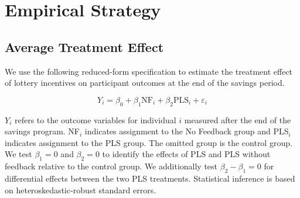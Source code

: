 \documentclass[11pt]{article}
\begin{document}
		\begin{table}[h!] \centering
			\caption{Summary of treatment conditions} \label{tab:treatments}
		\end{table}

		\clearpage

\section{Empirical Strategy} \label{sec:est}

	\subsection{Average Treatment Effect}

		We use the following reduced-form specification to estimate the treatment effect of lottery incentives on participant outcomes at the end of the savings period.

		\begin{equation} \label{eq:teffect}
			Y_{i} = \beta_{0} + \beta_{1}\text{NF}_{i} + \beta_{2}\text{PLS}_{i} + \varepsilon_{i}
		\end{equation}

		$Y_{i}$ refers to the outcome variables for individual $i$ measured after the end of the savings program. NF$_i$ indicates assignment to the No Feedback group and PLS$_i$ indicates assignment to the PLS group. The omitted group is the control group. We test $\beta_{1} = 0$ and $\beta_{2} = 0$ to identify the effects of PLS and PLS without feedback relative to the control group. We additionally test $\beta_{2} - \beta_{1} = 0$ for differential effects between the two PLS treatments. Statistical inference is based on heteroskedastic-robust standard errors.
\end{document}
